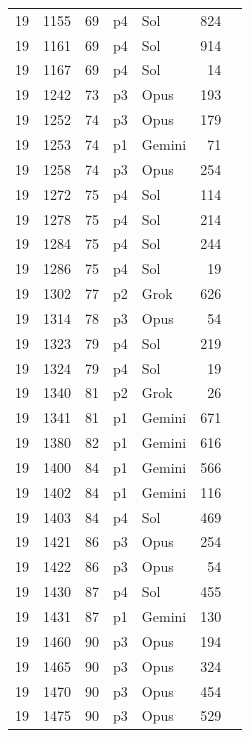 \begin{longtable}{r r r l l r L{2.2in}}
19 & 1155 & 69 & p4 & Sol & 824 &  \\
19 & 1161 & 69 & p4 & Sol & 914 &  \\
19 & 1167 & 69 & p4 & Sol & 14 &  \\
19 & 1242 & 73 & p3 & Opus & 193 &  \\
19 & 1252 & 74 & p3 & Opus & 179 &  \\
19 & 1253 & 74 & p1 & Gemini & 71 &  \\
19 & 1258 & 74 & p3 & Opus & 254 &  \\
19 & 1272 & 75 & p4 & Sol & 114 &  \\
19 & 1278 & 75 & p4 & Sol & 214 &  \\
19 & 1284 & 75 & p4 & Sol & 244 &  \\
19 & 1286 & 75 & p4 & Sol & 19 &  \\
19 & 1302 & 77 & p2 & Grok & 626 &  \\
19 & 1314 & 78 & p3 & Opus & 54 &  \\
19 & 1323 & 79 & p4 & Sol & 219 &  \\
19 & 1324 & 79 & p4 & Sol & 19 &  \\
19 & 1340 & 81 & p2 & Grok & 26 &  \\
19 & 1341 & 81 & p1 & Gemini & 671 &  \\
19 & 1380 & 82 & p1 & Gemini & 616 &  \\
19 & 1400 & 84 & p1 & Gemini & 566 &  \\
19 & 1402 & 84 & p1 & Gemini & 116 &  \\
19 & 1403 & 84 & p4 & Sol & 469 &  \\
19 & 1421 & 86 & p3 & Opus & 254 &  \\
19 & 1422 & 86 & p3 & Opus & 54 &  \\
19 & 1430 & 87 & p4 & Sol & 455 &  \\
19 & 1431 & 87 & p1 & Gemini & 130 &  \\
19 & 1460 & 90 & p3 & Opus & 194 &  \\
19 & 1465 & 90 & p3 & Opus & 324 &  \\
19 & 1470 & 90 & p3 & Opus & 454 &  \\
19 & 1475 & 90 & p3 & Opus & 529 &  \\

\end{longtable}
